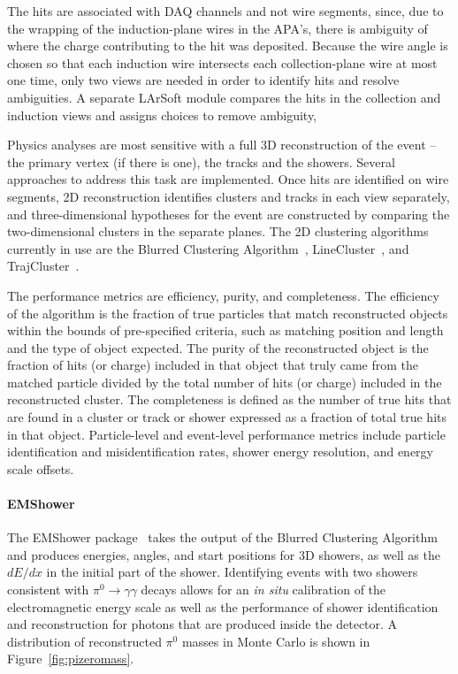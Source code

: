 The hits are associated with DAQ channels and
not wire segments, since, due to the wrapping of the induction-plane
wires in the \pdsp APA's, there is ambiguity of where the
charge contributing to the hit was deposited.  Because the wire angle
is chosen so that each induction wire intersects each collection-plane
wire at most one time, only two views are needed in order to identify
hits and resolve ambiguities.  A separate LArSoft module compares the
hits in the collection and induction views and assigns choices to
remove ambiguity, 

Physics analyses are most sensitive with a full 3D reconstruction of the
event -- the primary vertex (if there is one), the tracks and the showers.
Several approaches to address this task are implemented. Once hits are identified on wire
segments, 2D reconstruction identifies clusters and tracks
in each view separately, and three-dimensional hypotheses for
the event are constructed by comparing the two-dimensional clusters
in the separate planes.  The 2D clustering algorithms currently in
use are the Blurred Clustering Algorithm~\cite{blurredclustering},
LineCluster~\cite{linecluster}, and TrajCluster~\cite{trajcluster}.  

The performance metrics are efficiency, purity, and completeness.  The
efficiency of the algorithm is the fraction of true particles that
match reconstructed objects within the bounds of pre-specified
criteria, such as matching position and length and the type of object
expected.  The purity of the reconstructed object is the fraction of
hits (or charge) included in that object that truly came from the
matched particle divided by the total number of hits (or charge)
included in the reconstructed cluster.  The completeness is defined as
the number of true hits that are found in a cluster or track or shower
expressed as a fraction of total true hits in that object.  
Particle-level and event-level performance metrics include particle identification
and misidentification rates, shower energy resolution, and energy scale offsets.

\paragraph{EMShower}

The EMShower package~\cite{emshowerpackage} takes the output of the
Blurred Clustering Algorithm and
produces energies, angles, and start positions for 3D showers, as
well as the $dE/dx$ in the initial part of the shower.  Identifying
events with two showers consistent with $\pi^0\rightarrow\gamma\gamma$
decays allows for an {\it in situ} calibration of the electromagnetic
energy scale as well as the performance of shower identification and
reconstruction for photons that are produced inside the detector.  A
distribution of reconstructed $\pi^0$ masses in Monte Carlo is shown
in Figure~\ref{fig:pizeromass}.

